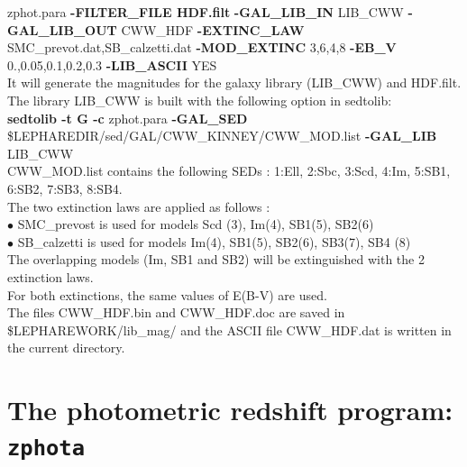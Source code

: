 \documentclass[12pt]{article}
\begin{document}
 zphot.para {\bf -FILTER\_FILE HDF.filt}  {\bf -GAL\_LIB\_IN}  LIB\_CWW  {\bf -GAL\_LIB\_OUT}  CWW\_HDF {\bf -EXTINC\_LAW} SMC\_prevot.dat,SB\_calzetti.dat  {\bf -MOD\_EXTINC} 3,6,4,8  {\bf -EB\_V} 0.,0.05,0.1,0.2,0.3  {\bf -LIB\_ASCII} YES \\
It will generate the magnitudes for the galaxy library (LIB\_CWW) and HDF.filt.
  The library  LIB\_CWW is built with the following option in sedtolib:\\
   {\bf sedtolib -t G -c } zphot.para {\bf -GAL\_SED} \$LEPHAREDIR/sed/GAL/CWW\_KINNEY/CWW\_MOD.list  
   {\bf -GAL\_LIB} LIB\_CWW   \\ 
   CWW\_MOD.list  contains the following SEDs :  1:Ell, 2:Sbc, 3:Scd, 4:Im, 5:SB1, 6:SB2, 7:SB3, 8:SB4.\\
%   

   \noindent The two extinction laws are applied as follows  : \\
   $\bullet$  SMC\_prevost is used for models Scd (3), Im(4), SB1(5), SB2(6) \\ 
   $\bullet$  SB\_calzetti  is used for models Im(4), SB1(5), SB2(6), SB3(7), SB4 (8) \\
   The overlapping models  (Im, SB1 and SB2) will be extinguished with the 2 extinction laws. \\
    For both extinctions, the same values of E(B-V) are used. \\ 
    
   The files CWW\_HDF.bin and CWW\_HDF.doc are saved in  \$LEPHAREWORK/lib\_mag/
   and the ASCII file CWW\_HDF.dat is written in the current directory.  
 
 



%
\newpage
\section{The photometric redshift program: \texttt{zphota}}
\end{document}
